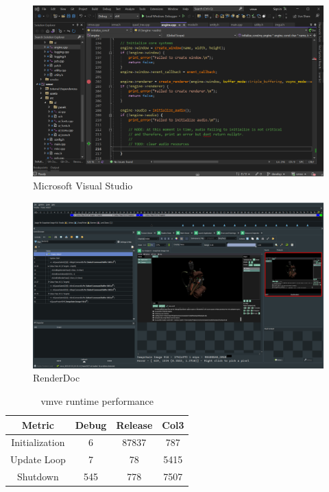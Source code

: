 \documentclass[11pt]{article}
\begin{document}
\begin{figure}[H]
  \centering
  \includegraphics[width=\textwidth]{images/visual_studio.png}
  \caption{Microsoft Visual Studio}
  \label{fig:visual_studio}
\end{figure}

\begin{figure}[H]
  \centering
  \includegraphics[width=\textwidth]{images/renderdoc.png}
  \caption{RenderDoc}
  \label{fig:renderdoc}
\end{figure}




\begin{table}[H]
\centering
\begin{tabular}{||c c c c||} 
  \hline
  Metric & Debug & Release & Col3 \\ [0.5ex] 
  \hline\hline
  Initialization & 6 & 87837 & 787 \\ 
  Update Loop & 7 & 78 & 5415 \\
  Shutdown & 545 & 778 & 7507 \\ [1ex] 
  \hline
\end{tabular}
\caption{\gls*{vmve} runtime performance}
\label{fig:runtime_performance}
\end{table}
\end{document}
